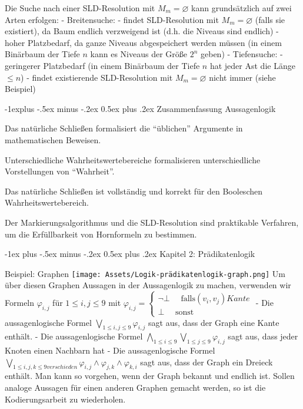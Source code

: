 \documentclass[a4paper]{article}
\makeatletter
\renewcommand{\section}{\@startsection{section}{1}{0mm}%
                {-1ex plus -.5ex minus -.2ex}%
                {0.5ex plus .2ex}%
                {\normalfont\large\bfseries}}
\renewcommand{\subsection}{\@startsection{subsection}{2}{0mm}%
                {-1explus -.5ex minus -.2ex}%
                {0.5ex plus .2ex}%
                {\normalfont\normalsize\bfseries}}
\makeatother
\begin{document}
\begin{multicols}{3}
  Die Suche nach einer SLD-Resolution mit $M_m=\varnothing$ kann
  grundsätzlich auf zwei Arten erfolgen: - Breitensuche: - findet
  SLD-Resolution mit $M_m=\varnothing$ (falls sie existiert), da Baum
  endlich verzweigend ist (d.h. die Niveaus sind endlich) - hoher
  Platzbedarf, da ganze Niveaus abgespeichert werden müssen (in einem
  Binärbaum der Tiefe $n$ kann es Niveaus der Größe $2^n$ geben) -
  Tiefensuche: - geringerer Platzbedarf (in einem Binärbaum der Tiefe $n$
  hat jeder Ast die Länge $\leq n$) - findet existierende SLD-Resolution
  mit $M_m=\varnothing$ nicht immer (siehe Beispiel)

  \subsection{Zusammenfassung
    Aussagenlogik}\label{zusammenfassung-aussagenlogik}

  \begin{itemize*}
    \itemsep1pt\parskip0pt
    \item
          Das natürliche Schließen formalisiert die ``üblichen'' Argumente in
          mathematischen Beweisen.
    \item
          Unterschiedliche Wahrheitswertebereiche formalisieren unterschiedliche
          Vorstellungen von ``Wahrheit''.
    \item
          Das natürliche Schließen ist vollständig und korrekt für den
          Booleschen Wahrheitswertebereich.
    \item
          Der Markierungsalgorithmus und die SLD-Resolution sind praktikable
          Verfahren, um die Erfüllbarkeit von Hornformeln zu bestimmen.
  \end{itemize*}

  \section{Kapitel 2: Prädikatenlogik}\label{kapitel-2-pruxe4dikatenlogik}

  Beispiel: Graphen
  \texttt{[image: Assets/Logik-prädikatenlogik-graph.png]} Um über diesen
  Graphen Aussagen in der Aussagenlogik zu machen, verwenden wir Formeln
  $\varphi_{i,j}$ für $1\leq i,j\leq 9$ mit
  $\varphi_{i,j}=\begin{cases} \lnot\bot\quad\text{ falls} (v_i,v_j) Kante\\ \bot\quad\text{ sonst}\end{cases}$
  - Die aussagenlogische Formel $\bigvee_{1\leq i,j\leq 9} \varphi_{i,j}$
  sagt aus, dass der Graph eine Kante enthält. - Die aussagenlogische
  Formel $\bigwedge_{1\leq i\leq 9} \bigvee_{1\leq j\leq 9} \varphi_{i,j}$
  sagt aus, dass jeder Knoten einen Nachbarn hat - Die aussagenlogische
  Formel
  $\bigvee_{1\leq i,j,k\leq 9 verschieden} \varphi_{i,j}\wedge\varphi_{j,k}\wedge\varphi_{k,i}$
  sagt aus, dass der Graph ein Dreieck enthält. Man kann so vorgehen, wenn
  der Graph bekannt und endlich ist. Sollen analoge Aussagen für einen
  anderen Graphen gemacht werden, so ist die Kodierungsarbeit zu
  wiederholen.


\end{multicols}
\end{document}
